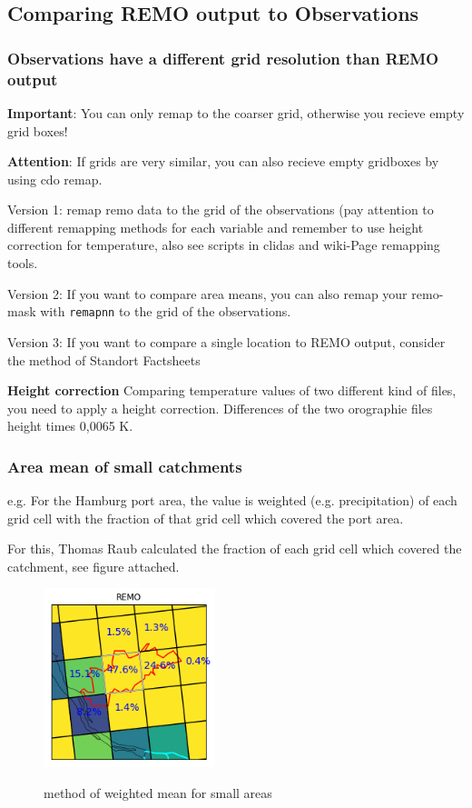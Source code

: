 \subsection{Comparing REMO output to Observations}

\subsubsection{Observations have a different grid resolution than REMO output}

\textbf{Important}: You can only remap to the coarser grid, otherwise you recieve empty grid boxes!

\textbf{Attention}: If grids are very similar, you can also recieve empty gridboxes by using cdo remap.

\item Version 1: remap remo data to the grid of the observations (pay attention to different remapping
methods for each variable and remember to use height correction for temperature,
also see scripts in clidas and wiki-Page remapping tools.

\item Version 2: If you want to compare area means, you can also remap your remo-mask with \texttt{remapnn} to the grid of the observations.

\item Version 3: If you want to compare a single location to REMO output, consider the method of Standort Factsheets 

\textbf{Height correction} Comparing temperature values of two different kind of files, you need to apply a height correction. 
Differences of the two orographie files \Delta height times 0,0065 K.

\subsubsection{Area mean of small catchments}

e.g. For the Hamburg port area, the value is weighted (e.g. precipitation) of each grid cell with the fraction of that grid cell which covered the port area. 

For this, Thomas Raub calculated the fraction of each grid cell which covered the catchment, see figure attached. 

\begin{figure} [h!tb]
\begin{center}
\includegraphics[width=5cm, natwidth=200, natheight=195]{./fig/krueckau_weights_REMOdetailliert.png} \\
\caption{method of weighted mean for small areas}
\end{center}
\end{figure}
\figure

